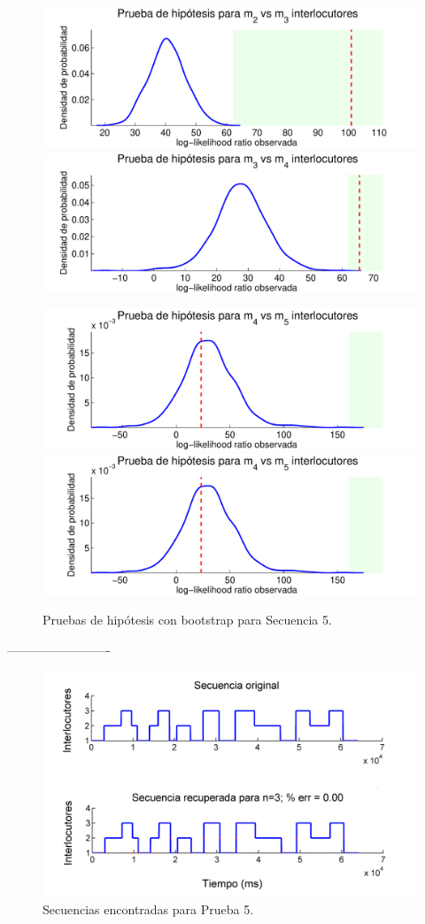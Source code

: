 \begin{figure}[H]
  \centerline  
  {\includegraphics[width=0.7\linewidth]{gfx/chap6/caldboot1}
   \includegraphics[width=0.7\linewidth]{gfx/chap6/caldboot2} }
  \centerline  
  {\includegraphics[width=0.7\linewidth]{gfx/chap6/caldboot3}
   \includegraphics[width=0.7\linewidth]{gfx/chap6/caldboot3}
  } \quad
  \caption{Pruebas de hipótesis con bootstrap para Secuencia 5.}
  \label{fig:prb1_boot}
\end{figure}

-------------------------

\begin{figure}[H]
  \centerline
  {\includegraphics[width=0.8\linewidth]{gfx/chap6/noct1_}} \quad
  \caption{Secuencias encontradas para Prueba 5.}
  \label{fig:prb1_seq}
\end{figure}

